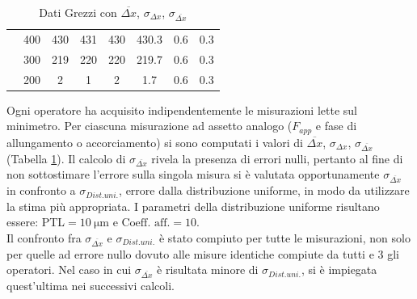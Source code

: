 \documentclass[a4paper,11pt,oneside]{article}
\begin{document}
\begin{table}[h!]
\begin{tabular}{|cc|c|c|c||c|c|c|}
        \multicolumn{1}{|c|}{}&{\cellcolor[rgb]{0.85,0.85,0.85}}400&	{\cellcolor[rgb]{0.85,0.85,0.85}}430&	{\cellcolor[rgb]{0.85,0.85,0.85}}431&	{\cellcolor[rgb]{0.85,0.85,0.85}}430&	{\cellcolor[rgb]{0.85,0.85,0.85}}430.3&	{\cellcolor[rgb]{0.85,0.85,0.85}}0.6&	{\cellcolor[rgb]{0.85,0.85,0.85}}0.3\\
        \multicolumn{1}{|c|}{}&300&	219&	220&	220&	219.7&	0.6&	0.3\\
        \multicolumn{1}{|c|}{}&{\cellcolor[rgb]{0.85,0.85,0.85}}200&	{\cellcolor[rgb]{0.85,0.85,0.85}}2&	{\cellcolor[rgb]{0.85,0.85,0.85}}1&	{\cellcolor[rgb]{0.85,0.85,0.85}}2&	{\cellcolor[rgb]{0.85,0.85,0.85}}1.7&	{\cellcolor[rgb]{0.85,0.85,0.85}}0.6&	{\cellcolor[rgb]{0.85,0.85,0.85}}0.3\\
        \hline
    \end{tabular}
    \caption{Dati Grezzi con $\overline{\Delta x}$, $\sigma_{\Delta x}$, $\sigma_{\overline{\Delta x}}$}
    \label{tab:dati_grezzi_1ac}
\end{table}

Ogni operatore ha acquisito indipendentemente le misurazioni lette sul minimetro. Per ciascuna misurazione ad assetto analogo ($F_{app}$ e fase di allungamento o accorciamento) si sono computati i valori di $\overline{\Delta x}$, $\sigma_{\Delta x}$, $\sigma_{\overline{\Delta x}}$ (Tabella \ref{tab:dati_grezzi_1ac}).
Il calcolo di $\sigma_{\overline{\Delta x}}$ rivela la presenza di errori nulli, pertanto al fine di non sottostimare l'errore sulla singola misura si è valutata opportunamente $\sigma_{\overline{\Delta x}}$ in confronto a $\sigma_{Dist. uni.}$, errore dalla distribuzione uniforme, in modo da utilizzare la stima più appropriata. I parametri della distribuzione uniforme risultano essere: PTL$=\SI{10}{\micro\meter}$ e $\text{Coeff. aff.}=\num{10}$.\\
Il confronto fra $\sigma_{\overline{\Delta x}}$ e $\sigma_{Dist. uni.}$ è stato compiuto per tutte le misurazioni, non solo per quelle ad errore nullo dovuto alle misure identiche compiute da tutti e 3 gli operatori. Nel caso in cui $\sigma_{\overline{\Delta x}}$ è risultata minore di $\sigma_{Dist. uni.}$, si è impiegata quest'ultima nei successivi calcoli.\\%
\end{document}
